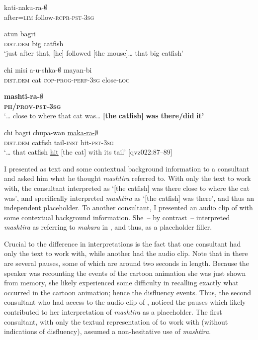 \documentclass[output=paper]{langscibook}
\begin{document}
\ea%
\label{ex:rice:16}
\ea  \label{ex:rice:16a}   {kati-naku-ra-${\emptyset}$} {}  \\
{after=\textsc{lim}} {follow-\textsc{rcpr-pst-3sg}} {} \\
\medskip

 {atun} {bagri}\\
\textsc{dist.dem} {big} {catfish}\\
\glt ‘just after that, [he] followed [the mouse]… that big catfish’
\medskip

\ex \label{ex:rice:16b}  {chi} {misi} {a-u-shka-${\emptyset}$} {mayan-bi}\\
{} {\textsc{dist.dem}}  {cat}  {\textsc{cop-prog-perf-3sg}} {close-\textsc{loc}}\\
\medskip
        
 {\textbf{mashti-ra-${\emptyset}$}}\\
{} {\textbf{\textsc{ph/prov-pst-3sg}}}\\
\glt ‘… close to where that cat was… \textbf{[the} \textbf{catfish]} \textbf{was} \textbf{there/did} \textbf{it’}
\medskip

\ex \label{ex:rice:16c}
 {chi} {bagri} {chupa-wan} {\uline{maka-ra-${\emptyset}$}}\\
{} {\textsc{dist.dem}} {catfish} {tail\textsc{{}-inst}} {hit-\textsc{pst-3sg}}\\
\glt‘… that catfish {\uline{hit}} [the cat] with its tail’ [qvz022:87--89]
\z\z


I presented  as text and some contextual background information to a consultant and asked him what he thought \textit{mashtira} referred to. With only the text to work with, the consultant interpreted  as ‘[the catfish] was there close to where the cat was’, and specifically interpreted \textit{mashtira} as ‘[the catfish] was there’, and thus an independent placeholder. To another consultant, I presented an audio clip of  with some contextual background information. She~-- by contrast~-- interpreted \textit{mashtira} as referring to \textit{makara} in , and thus, as a placeholder filler.

Crucial to the difference in interpretations is the fact that one consultant had only the text to work with, while another had the audio clip. Note that in  there are several pauses, some of which are around two seconds in length. Because the speaker was recounting the events of the cartoon animation she was just shown from memory, she likely experienced some difficulty in recalling exactly what occurred in the cartoon animation; hence the disfluency events. Thus, the second consultant who had access to the audio clip of , noticed the pauses which likely contributed to her interpretation of \textit{mashtira} as a placeholder. The first consultant, with only the textual representation of  to work with (without indications of disfluency), assumed a non-hesitative use of \textit{mashtira}.  
\end{document}
